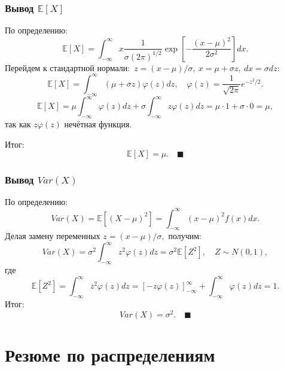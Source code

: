 \documentclass[
  russian,
  12pt,
  a4paper,
  a4paper,
  openany]{scrbook}
\begin{document}
\begin{bookderivation}

\subsubsection{\texorpdfstring{\textbf{Вывод}
\(\mathbb{E}[X]\)}{Вывод \textbackslash mathbb\{E\}{[}X{]}}}\label{ux432ux44bux432ux43eux434-mathbbex}

По определению:
\[\mathbb{E}[X]=\int_{-\infty}^\infty x\frac{1}{\sigma (2\pi)^{1/2}}\exp\left[-\frac{(x-\mu)^2}{2\sigma^2}\right]dx.\]
Перейдем к стандартной нормали:~\(z=(x−μ)/σ,~x=μ+σz,~dx=σdz:\)
\[\mathbb{E}[X]=\int_{-\infty}^\infty (\mu+\sigma z)\varphi(z)dz, \quad \varphi(z)=\frac{1}{\sqrt{2\pi}}e^{-z^2/2}.\]
\[\mathbb{E}[X]=\mu\int_{-\infty}^\infty \varphi(z)dz+\sigma\int_{-\infty}^\infty z\varphi(z)dz=\mu\cdot1+\sigma\cdot 0=\mu,\]
так как \(z\varphi(z)\) нечётная функция.

Итог: \[\mathbb{E}[X]=\mu. \quad \blacksquare\]

\end{bookderivation}

\begin{bookderivation}

\subsubsection{\texorpdfstring{\textbf{Вывод}
\(Var(X)\)}{Вывод Var(X)}}\label{ux432ux44bux432ux43eux434-varx}

По определению:
\[Var(X)=\mathbb{E}\left[(X-\mu)^2\right]=\int_{-\infty}^\infty (x-\mu)^2 f(x)dx.\]
Делая замену переменных \(z=(x-\mu)/\sigma,\) получим:
\[Var(X)=\sigma^2\int_{-\infty}^\infty z^2 \varphi(z) dz=\sigma^2 \mathbb{E}\left[Z^2\right], \quad Z\sim N(0,1),\]
где
\[\mathbb{E}\left[Z^2\right]=\int_{-\infty}^\infty z^2 \varphi(z)dz=\left[-z\varphi(z)\right]^{\infty}_{-\infty}+\int_{-\infty}^\infty \varphi(z)dz=1.\]
Итог: \[Var(X)=\sigma^2. \quad \blacksquare\]

\end{bookderivation}

\section{Резюме по
распределениям}\label{ux440ux435ux437ux44eux43cux435-ux43fux43e-ux440ux430ux441ux43fux440ux435ux434ux435ux43bux435ux43dux438ux44fux43c}
\end{document}
